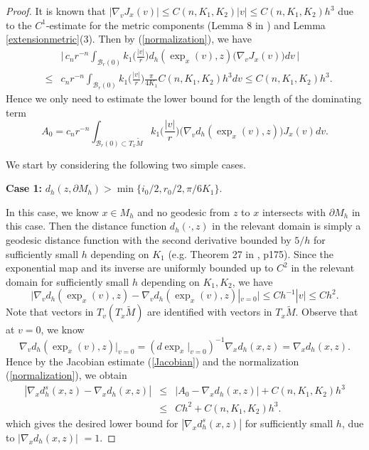 \documentclass[11pt,letterpaper]{amsart}
\numberwithin{equation}{section}
\theoremstyle{definition}
\theoremstyle{plain}
\theoremstyle{definition}
\theoremstyle{plain}
\theoremstyle{definition}
\theoremstyle{plain}
\begin{document}
\begin{proof}
It is known that $|\nabla_v J_x(v)|\leqslant C(n,K_1,K_2)|v|\leqslant C(n,K_1,K_2)h^3$ due to the $C^1$-estimate for the metric components (Lemma 8 in \cite{HV}) and Lemma \ref{extensionmetric}(3). 
Then by (\ref{normalization}), we have
\begin{eqnarray*}
&& \bigg| \, c_{n}r^{-n} \int_{\mathcal{B}_{r}(0)}  k_1\big(\frac{|v|}{r}\big) d_h(\exp_x(v),z) \big(\nabla_v J_x(v)\big) dv \, \bigg| \\ &\leqslant& c_{n}r^{-n} \int_{\mathcal{B}_{r}(0)}  k_1\big(\frac{|v|}{r}\big) \frac{\pi}{4K_1} C(n,K_1,K_2)h^3 dv \leqslant C(n,K_1,K_2)h^3.
\end{eqnarray*}
Hence we only need to estimate the lower bound for the length of the dominating term
\begin{equation}\label{ddA0}
A_0=c_{n}r^{-n} \int_{\mathcal{B}_{r}(0)\subset T_x \widetilde{M}}  k_1\big(\frac{|v|}{r}\big) \big(\nabla_v d_h(\exp_x(v),z)\big) J_x(v) dv.
\end{equation}

We start by considering the following two simple cases.

\smallskip
\textbf{Case 1:}  $d_h(z,\partial M_h)>\min\{i_0/2,r_0/2,\pi/6K_1\}$.

In this case, we know $x\in M_h$ and no geodesic from $z$ to $x$ intersects with $\partial M_h$ in this case. Then the distance function $d_h(\cdot,z)$ in the relevant domain is simply a geodesic distance function with the second derivative bounded by $5/h$ for sufficiently small $h$ depending on $K_1$ (e.g. Theorem 27 in \cite{PP}, p175). Since the exponential map and its inverse are uniformly bounded up to $C^2$ in the relevant domain for sufficiently small $h$ depending on $K_1,K_2$, we have
$$\big|\nabla_v d_h(\exp_x(v),z)-\nabla_v d_h(\exp_x(v),z)|_{v=0}\big|\leqslant Ch^{-1}|v| \leqslant Ch^2.$$
Note that vectors in $T_v(T_x \widetilde{M})$ are identified with vectors in $T_x \widetilde{M}$. Observe that at $v=0$, we know 
$$\nabla_v d_h(\exp_x(v),z) \big|_{v=0}=(d\exp_x |_{v=0})^{-1} \nabla_x d_h(x,z)=\nabla_x d_h(x,z).$$ 
Hence by the Jacobian estimate (\ref{Jacobian}) and the normalization (\ref{normalization}), we obtain
\begin{eqnarray*}
|\nabla_x d_h^s(x,z)-\nabla_x d_h(x,z)|&\leqslant & |A_0-\nabla_x d_h(x,z)|+C(n,K_1,K_2)h^3 \\
&\leqslant& Ch^2+C(n,K_1,K_2)h^3.
\end{eqnarray*}
which gives the desired lower bound for $|\nabla_x d_h^s(x,z)|$ for sufficiently small $h$, due to $|\nabla_x d_h(x,z)|$ $=1$. 


\end{proof}
\end{document}
